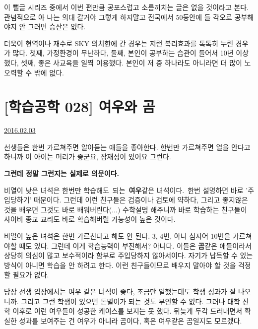이 뻘글 시리즈 중에서 이번 편만큼 공포스럽고 소름끼치는 글은 없을 것이라고 본다.
관념적으로 아 나는 의대 갈거야 그렇게 하지말고
전국에서 50등안에 들 각오로 공부해야지 안 그러면 승산은 없다.
\vspace{5mm}

더욱이 현역이나 재수로 SKY 의치한에 간 경우는 저런 복리효과를 톡톡히 누린 경우가 많다.
첫째, 가정환경이 무난하다, 둘째, 본인이 공부하는 습관이 들어서 10년 이상 했다, 셋째, 좋은 사교육을 일찍 이용했다.
본인이 저 중 하나라도 아니라면 더 많이 노오력할 수 밖에 없다.






\section{[학습공학 028] 여우와 곰}
\href{https://www.kockoc.com/Apoc/622613}{2016.02.03}

\vspace{5mm}

선생들은 한번 가르쳐주면 알아듣는 애들을 좋아한다.
한번만 가르쳐주면 열을 안다고 하니까 이 아이는 머리가 좋군요, 잠재성이 있어요 그런다.
\vspace{5mm}

\textbf{그런데 정말 그런지는 실제로 의문이다.}
\vspace{5mm}

비열이 낮은 녀석은 한번만 학습해도 되는 \textbf{여우}같은 녀석이다. 한번 설명하면 바로 '주입당하기' 때문이다.
그런데 이런 친구들은 검증이나 검토에 약하다, 그리고 좋지않은 것을 배우면 그것도 바로 배워버린다(...)
수학설명 해주니까 바로 학습하는 친구들이 사이비 종교 교리도 바로 학습해버릴 가능성이 높은 것이다.
\vspace{5mm}

비열이 높은 녀석은 한번 가르친다고 해도 안 된다. 3, 4번, 아니 심지어 10번을 가르쳐야할 때도 있다.
그런데 이게 학습능력이 부진해서? 아니다. 이들은 \textbf{곰}같은 애들이라서 상당히 의심이 많고 보수적이라 함부로 주입당하지 않아서이다.
자기가 납득할 수 있는 방식이 아니면 학습을 안 하려고 한다. 이런 친구들이므로 배우지 말아야 할 것을 걱정할 필요가 없다.
\vspace{5mm}

당장 선생 입장에서는 여우 같은 녀석이 좋다, 조금만 일했는데도 학생 성과가 잘 나오니까.
그리고 그런 학생이 있으면 돈벌이가 되는 것도 부인할 수 없다.
그러나 대학 진학 이후로 이런 여우들이 성공한 케이스를 보지는 못 했다.
뒤늦게 두각 드러내면서 확실한 성과를 보여주는 건 여우가 아니라 곰이다, 혹은 여우같은 곰일지도 모르겠다.
\vspace{5mm}

